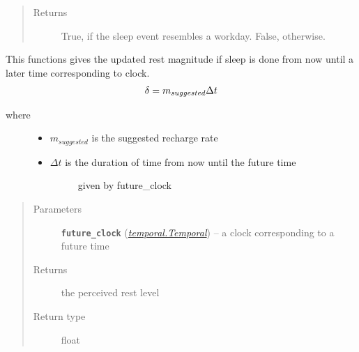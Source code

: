 \documentclass[letterpaper,10pt,english]{sphinxmanual}
\begin{document}
\begin{fulllineitems}
\begin{fulllineitems}
\begin{quote}
\begin{description}
\item[{Returns}] \leavevmode
True, if the sleep event resembles a workday. False, otherwise.

\end{description}\end{quote}

\end{fulllineitems}


\begin{fulllineitems}
\label{rest:rest.Rest.perceive}
This functions gives the updated rest magnitude if sleep is done from now until a later time         corresponding to clock.
\begin{gather}
\begin{split}\delta = m_{suggested}\Delta{t}\end{split}\notag
\end{gather}\begin{description}
\item[{where}] \leavevmode\begin{itemize}
\item {} 
\(m_{suggested}\) is the suggested recharge rate

\item {} \begin{description}
\item[{\(\Delta{t}\) is the duration of time from now until the future time}] \leavevmode
given by future\_clock

\end{description}

\end{itemize}

\end{description}
\begin{quote}\begin{description}
\item[{Parameters}] \leavevmode
\textbf{\texttt{future\_clock}} ({\hyperref[temporal:temporal.Temporal]{\emph{\emph{temporal.Temporal}}}}) -- a clock corresponding to a future time

\item[{Returns}] \leavevmode
the perceived rest level

\item[{Return type}] \leavevmode
float

\end{description}\end{quote}


\end{fulllineitems}
\end{fulllineitems}
\end{document}
